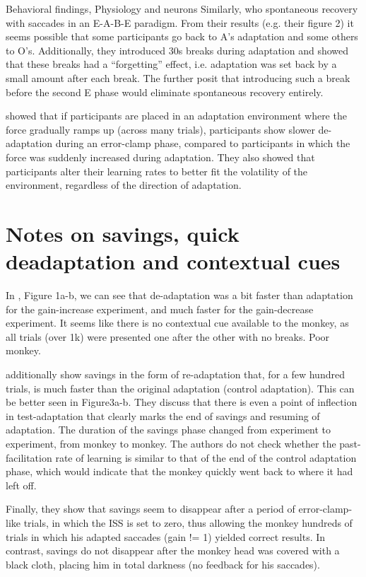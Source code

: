 \documentclass{report}
\begin{document}
\begin{chapter}{Behavioral findings, Physiology and neurons}
Similarly, \cite{Ethier_Spontaneous_2008} who spontaneous recovery with
saccades in an E-A-B-E paradigm. From their results (e.g. their figure 2) it
seems possible that some participants go back to A's adaptation and some others
to O's. Additionally, they introduced 30s breaks during adaptation and showed
that these breaks had a ``forgetting'' effect, i.e. adaptation was set back by
a small amount after each break. The further posit that introducing such a
break before the second E phase would eliminate spontaneous recovery entirely.

\cite{Huang_Persistence_2009} showed that if participants are placed in an
adaptation environment where the force gradually ramps up (across many trials),
participants show slower de-adaptation during an error-clamp phase, compared to
participants in which the force was suddenly increased during adaptation. They
also showed that participants alter their learning rates to better fit the
volatility of the environment, regardless of the direction of adaptation.




\section{Notes on savings, quick deadaptation and contextual cues}
In \citep{Kojima_Memory_2004}, Figure 1a-b, we can see that de-adaptation was a
bit faster than adaptation for the gain-increase experiment, and much faster
for the gain-decrease experiment. It seems like there is no contextual cue
available to the monkey, as all trials (over 1k) were presented one after the
other with no breaks. Poor monkey.

\citep{Kojima_Memory_2004} additionally show savings in the form of
re-adaptation that, for a few hundred trials, is much faster than the original
adaptation (control adaptation). This can be better seen in Figure3a-b. They
discuss that there is even a point of inflection in test-adaptation that
clearly marks the end of savings and resuming of adaptation. The duration of
the savings phase changed from experiment to experiment, from monkey to
monkey. The authors do not check whether the past-facilitation rate of learning
is similar to that of the end of the control adaptation phase, which would
indicate that the monkey quickly went back to where it had left off.

Finally, they show that savings seem to disappear after a period of
error-clamp-like trials, in which the ISS is set to zero, thus allowing the
monkey hundreds of trials in which his adapted saccades (gain != 1) yielded
correct results. In contrast, savings do not disappear after the monkey head
was covered with a black cloth, placing him in total darkness (no feedback for
his saccades).


\end{chapter}
\end{document}
